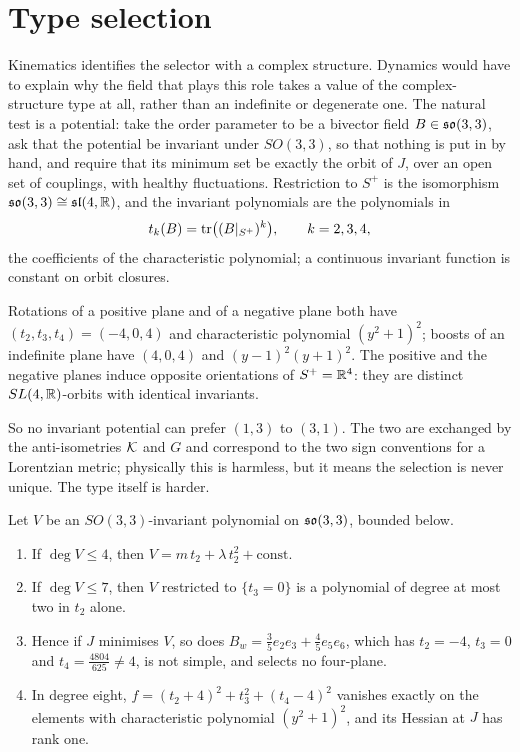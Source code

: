 \section{Type selection}
\label{sec:typesel}

Kinematics identifies the selector with a complex structure. Dynamics would have to explain why the field that plays this role takes a value of the
complex-structure type at all, rather than an indefinite or degenerate one. The natural test is a potential: take the order parameter to be a bivector field
$B\in\mathfrak{so}(3,3)$, ask that the potential be invariant under $SO(3,3)$, so that nothing is put in by hand, and require that its minimum set be exactly the orbit of $J$,
over an open set of couplings, with healthy fluctuations. Restriction to $S^+$ is the isomorphism $\mathfrak{so}(3,3)\cong\mathfrak{sl}(4,\mathbb{R})$, and the invariant polynomials are the
polynomials in
\[
t_k(B)=\operatorname{tr}\bigl((B|_{S^+})^k\bigr),\qquad k=2,3,4,
\]
the coefficients of the characteristic polynomial; a continuous invariant function is constant on orbit closures.

\begin{proposition}
\label{prop:types}
Rotations of a positive plane and of a negative plane both have $(t_2,t_3,t_4)=(-4,0,4)$ and characteristic polynomial $(y^2+1)^2$; boosts of an indefinite plane have
$(4,0,4)$ and $(y-1)^2(y+1)^2$. The positive and the negative planes induce opposite orientations of $S^+=\mathbb{R}^4$: they are distinct $SL(4,\mathbb{R})$-orbits with identical
invariants.
\end{proposition}

So no invariant potential can prefer $(1,3)$ to $(3,1)$. The two are exchanged by the anti-isometries $\mathcal K$ and $G$ and correspond to the two sign conventions for a
Lorentzian metric; physically this is harmless, but it means the selection is never unique. The type itself is harder.

\begin{theorem}
\label{thm:degree}
Let $V$ be an $SO(3,3)$-invariant polynomial on $\mathfrak{so}(3,3)$, bounded below.
\begin{enumerate}[label=(\roman*),leftmargin=2.2em]
\item If $\deg V\le4$, then $V=m\,t_2+\lambda\,t_2^2+\mathrm{const}$.
\item If $\deg V\le7$, then $V$ restricted to $\{t_3=0\}$ is a polynomial of degree at most two in $t_2$ alone.
\item Hence if $J$ minimises $V$, so does $B_w=\tfrac35e_2e_3+\tfrac45e_5e_6$, which has $t_2=-4$, $t_3=0$ and $t_4=\tfrac{4804}{625}\neq4$, is not simple, and selects no four-plane.
\item In degree eight, $f=(t_2+4)^2+t_3^2+(t_4-4)^2$ vanishes exactly on the elements with characteristic polynomial $(y^2+1)^2$, and its Hessian at $J$ has rank one.
\end{enumerate}
\end{theorem}

